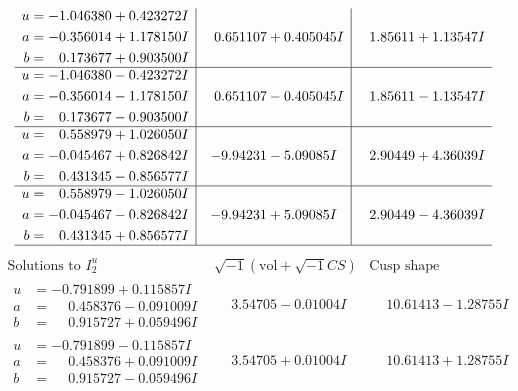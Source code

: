 \documentclass[1p]{elsarticle_modified}
\theoremstyle{definition}
\newcommand{\I}{\sqrt{-1}}
\begin{document}
$$\begin{array}{c|c|c}
\begin{aligned}
u &= -1.046380 + 0.423272 I \\
a &= -0.356014 + 1.178150 I \\
b &= \phantom{-}0.173677 + 0.903500 I\end{aligned}
 & \phantom{-}0.651107 + 0.405045 I & \phantom{-}1.85611 + 1.13547 I \\ \hline\begin{aligned}
u &= -1.046380 - 0.423272 I \\
a &= -0.356014 - 1.178150 I \\
b &= \phantom{-}0.173677 - 0.903500 I\end{aligned}
 & \phantom{-}0.651107 - 0.405045 I & \phantom{-}1.85611 - 1.13547 I \\ \hline\begin{aligned}
u &= \phantom{-}0.558979 + 1.026050 I \\
a &= -0.045467 + 0.826842 I \\
b &= \phantom{-}0.431345 - 0.856577 I\end{aligned}
 & -9.94231 - 5.09085 I & \phantom{-}2.90449 + 4.36039 I \\ \hline\begin{aligned}
u &= \phantom{-}0.558979 - 1.026050 I \\
a &= -0.045467 - 0.826842 I \\
b &= \phantom{-}0.431345 + 0.856577 I\end{aligned}
 & -9.94231 + 5.09085 I & \phantom{-}2.90449 - 4.36039 I\\
 \hline 
 \end{array}$$\newpage$$\begin{array}{c|c|c}  
\text{Solutions to }I^u_{2}& \I (\text{vol} + \sqrt{-1}CS) & \text{Cusp shape}\\
 \hline 
\begin{aligned}
u &= -0.791899 + 0.115857 I \\
a &= \phantom{-}0.458376 - 0.091009 I \\
b &= \phantom{-}0.915727 + 0.059496 I\end{aligned}
 & \phantom{-}3.54705 - 0.01004 I & \phantom{-}10.61413 - 1.28755 I \\ \hline\begin{aligned}
u &= -0.791899 - 0.115857 I \\
a &= \phantom{-}0.458376 + 0.091009 I \\
b &= \phantom{-}0.915727 - 0.059496 I\end{aligned}
 & \phantom{-}3.54705 + 0.01004 I & \phantom{-}10.61413 + 1.28755 I \\ \hline\begin{aligned}

\end{aligned}
\end{array}$$
\end{document}

